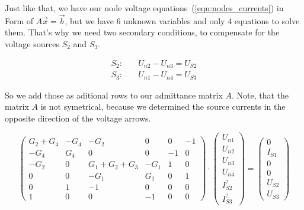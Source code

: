 {Just like that, we have our node voltage equations \,(\ref{eqn:nodes_currents}) in Form of $A \vec{x} = \vec{b}$, but we have 6 unknown
variables and only 4 equations to solve them. That's why we need two secondary conditions, to
compensate for the voltage sources $S_2$ and $S_3$.

\begin{align*}
   S_2: \quad &U_{n2} - U_{n3}= U_{S2} \\ 
   S_3: \quad &U_{n1} - U_{n4} = U_{S3}
\end{align*}

So we add those as aditional rows to our admittance matrix $A$. Note, that the matrix $A$ is not
symetrical, because we determined the source currents in the opposite direction of the
voltage arrows. 

\begin{equation}
\begin{pmatrix}
   G_2 + G_4 & -G_4 & -G_2 & 0 & 0 & -1 \\
   -G_4 & G_4 & 0 & 0 & -1 & 0 \\
   -G_2 & 0 & G_1+G_2+G_3 & -G_1 & 1 & 0 \\
   0 & 0 & -G_1 & G_1 & 0 & 1 \\ 
   0 & 1 & -1 & 0 & 0 & 0 \\
   1 & 0 & 0 & -1 & 0 & 0 
\end{pmatrix}
\cdot
\begin{pmatrix}
   U_{n1} \\ U_{n2} \\ U_{n3} \\ U_{n4} \\ I_{S2}^? \\ I_{S3}^?
\end{pmatrix}
=
\begin{pmatrix}
   0 \\ I_{S1} \\ 0 \\ 0 \\ U_{S2} \\ U_{S3} 
\end{pmatrix}
\label{eqn:nodes_currents_src}
\end{equation}

}
